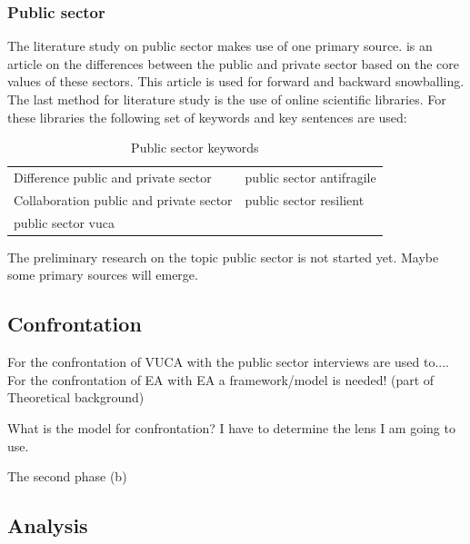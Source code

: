 \subsubsection{Public sector}
\label{subsub:publicsector}
The literature study on public sector makes use of one primary source. \textcite{Wal2008} is an article on the differences between the public and private sector based on the core values of these sectors. This article is used for forward and backward snowballing. The last method for literature study is the use of online scientific libraries. For these libraries the following set of keywords and key sentences are used:

\begin{table}[H]
	\centering
	\begin{tabular}{p{}p{}}
		\toprule
		Difference public and private sector &	public sector \gls{antifragile}\\%
		Collaboration public and private sector & public sector \gls{resilient}\\%
		public sector \acrshort{vuca} & \\%
		\bottomrule
	\end{tabular}
	\caption{Public sector keywords}
	\label{tab:publicsectorkeywords}
\end{table}

\begin{remark}
	The preliminary research on the topic public sector is not started yet. Maybe some primary sources will emerge.
\end{remark}

\subsection{Confrontation}
\label{sub:confrontationphase}

For the confrontation of VUCA with the public sector interviews are used to....\\
For the confrontation of EA with EA a framework/model is needed! (part of Theoretical background)

\begin{remark}
	What is the model for confrontation?
	I have to determine the lens I am going to use.
\end{remark}

The second phase (b) 

\subsection{Analysis}
\label{sub:analysisphase}

